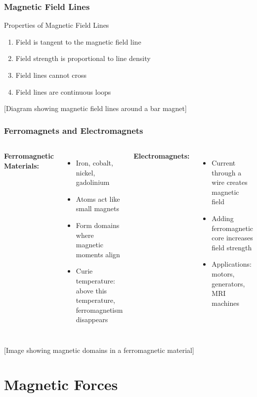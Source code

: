 \documentclass{beamer}
\begin{document}
\begin{frame}
\frametitle{Magnetic Field Lines}
\begin{block}{Properties of Magnetic Field Lines}
\begin{enumerate}
    \item Field is tangent to the magnetic field line
    \item Field strength is proportional to line density
    \item Field lines cannot cross
    \item Field lines are continuous loops
\end{enumerate}
\end{block}
\alert{[Diagram showing magnetic field lines around a bar magnet]}
\end{frame}

\begin{frame}
\frametitle{Ferromagnets and Electromagnets}
\begin{columns}
\textbf{Ferromagnetic Materials:}
\begin{itemize}
    \item Iron, cobalt, nickel, gadolinium
    \item Atoms act like small magnets
    \item Form domains where magnetic moments align
    \item Curie temperature: above this temperature, ferromagnetism disappears
\end{itemize}
\textbf{Electromagnets:}
\begin{itemize}
    \item Current through a wire creates magnetic field
    \item Adding ferromagnetic core increases field strength
    \item Applications: motors, generators, MRI machines
\end{itemize}
\end{columns}
\alert{[Image showing magnetic domains in a ferromagnetic material]}
\end{frame}

\section{Magnetic Forces}
\end{document}
